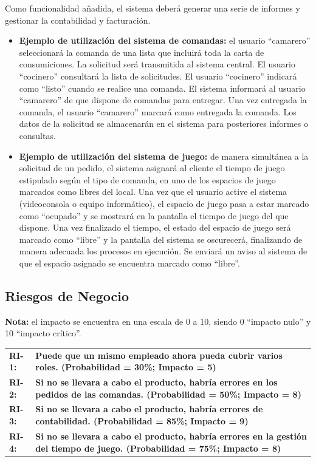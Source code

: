 \documentclass[a4paper,11pt]{article}
\begin{document}
			Como funcionalidad añadida, el sistema deberá generar una serie de informes y gestionar la contabilidad y 					facturación.
			
			\begin{itemize}
				\item \textbf{Ejemplo de utilización del sistema de comandas:} el usuario “camarero” seleccionará la 								comanda de una lista que incluirá toda la carta de consumiciones. La solicitud será transmitida 							al sistema central. El usuario “cocinero” consultará la lista de solicitudes. El usuario “cocinero” 								indicará como “listo” cuando se realice una comanda. El sistema informará al usuario 									“camarero” de que dispone de comandas para entregar. Una vez entregada la comanda, el 								usuario “camarero” marcará como entregada la comanda. Los datos de la solicitud se 									almacenarán en el sistema para posteriores informes o consultas.
				\item \textbf{Ejemplo de utilización del sistema de juego:} de manera simultánea a la solicitud de un 								pedido, el sistema asignará al cliente el tiempo de juego estipulado según el tipo de comanda, 							en uno de los espacios de juego marcados como libres del local. Una vez que el usuario active el 							sistema (videoconsola o equipo informático), el espacio de juego pasa a estar marcado como 								“ocupado” y se mostrará en la pantalla el tiempo de juego del que dispone. Una vez finalizado el 							tiempo, el estado del espacio de juego será marcado como “libre” y la pantalla del sistema se 								oscurecerá, finalizando de manera adecuada los procesos en ejecución.  Se enviará un aviso al 							sistema de que el espacio asignado se encuentra marcado como “libre”.
			\end{itemize}
			\newpage
		\subsection{Riesgos de Negocio}
			\textbf{Nota:} el impacto se encuentra en una escala de 0 a 10, siendo 0 “impacto nulo” y 10 “impacto crítico”.
			\begin{center}
				\begin{tabular}{l p{11cm}}
					\textbf{RI-1:} & \textbf{Puede que un mismo empleado ahora pueda cubrir varios roles. 												(Probabilidad = 30\%; Impacto = 5)}\\
					\textbf{RI-2:} & \textbf{Si no se llevara a cabo el producto, habría errores en los pedidos de las 											comandas. (Probabilidad = 50\%; Impacto = 8)} \\
					\textbf{RI-3:} & \textbf{Si no se llevara a cabo el producto, habría errores de contabilidad. 												(Probabilidad = 85\%; Impacto = 9)} \\
					\textbf{RI-4:} & \textbf{Si no se llevara a cabo el producto, habría errores en la gestión del tiempo 											de juego. (Probabilidad = 75\%; Impacto = 8)} \\
				\end{tabular}
			\end{center}
	\newpage
\end{document}
